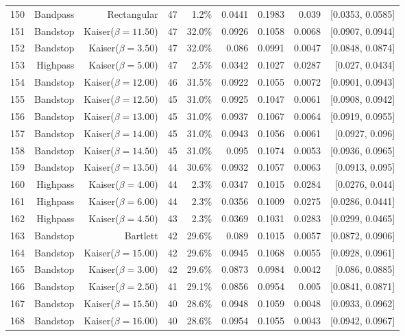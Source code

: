 \begin{longtable}{lrrrrrrrr}
    150 & Bandpass & Rectangular & 47 & 1.2\% & 0.0441 & 0.1983 & 0.039 & [0.0353, 0.0585] \\
    151 & Bandstop & Kaiser($\beta=11.50$) & 47 & 32.0\% & 0.0926 & 0.1058 & 0.0068 & [0.0907, 0.0944] \\
    152 & Bandstop & Kaiser($\beta=3.50$) & 47 & 32.0\% & 0.086 & 0.0991 & 0.0047 & [0.0848, 0.0874] \\
    153 & Highpass & Kaiser($\beta=5.00$) & 47 & 2.5\% & 0.0342 & 0.1027 & 0.0287 & [0.027, 0.0434] \\
    154 & Bandstop & Kaiser($\beta=12.00$) & 46 & 31.5\% & 0.0922 & 0.1055 & 0.0072 & [0.0901, 0.0943] \\
    155 & Bandstop & Kaiser($\beta=12.50$) & 45 & 31.0\% & 0.0925 & 0.1047 & 0.0061 & [0.0908, 0.0942] \\
    156 & Bandstop & Kaiser($\beta=13.00$) & 45 & 31.0\% & 0.0937 & 0.1067 & 0.0064 & [0.0919, 0.0955] \\
    157 & Bandstop & Kaiser($\beta=14.00$) & 45 & 31.0\% & 0.0943 & 0.1056 & 0.0061 & [0.0927, 0.096] \\
    158 & Bandstop & Kaiser($\beta=14.50$) & 45 & 31.0\% & 0.095 & 0.1074 & 0.0053 & [0.0936, 0.0965] \\
    159 & Bandstop & Kaiser($\beta=13.50$) & 44 & 30.6\% & 0.0932 & 0.1057 & 0.0063 & [0.0913, 0.095] \\
    160 & Highpass & Kaiser($\beta=4.00$) & 44 & 2.3\% & 0.0347 & 0.1015 & 0.0284 & [0.0276, 0.044] \\
    161 & Highpass & Kaiser($\beta=6.00$) & 44 & 2.3\% & 0.0356 & 0.1009 & 0.0275 & [0.0286, 0.0441] \\
    162 & Highpass & Kaiser($\beta=4.50$) & 43 & 2.3\% & 0.0369 & 0.1031 & 0.0283 & [0.0299, 0.0465] \\
    163 & Bandstop & Bartlett & 42 & 29.6\% & 0.089 & 0.1015 & 0.0057 & [0.0872, 0.0906] \\
    164 & Bandstop & Kaiser($\beta=15.00$) & 42 & 29.6\% & 0.0945 & 0.1068 & 0.0055 & [0.0928, 0.0961] \\
    165 & Bandstop & Kaiser($\beta=3.00$) & 42 & 29.6\% & 0.0873 & 0.0984 & 0.0042 & [0.086, 0.0885] \\
    166 & Bandstop & Kaiser($\beta=2.50$) & 41 & 29.1\% & 0.0856 & 0.0954 & 0.005 & [0.0841, 0.0871] \\
    167 & Bandstop & Kaiser($\beta=15.50$) & 40 & 28.6\% & 0.0948 & 0.1059 & 0.0048 & [0.0933, 0.0962] \\
    168 & Bandstop & Kaiser($\beta=16.00$) & 40 & 28.6\% & 0.0954 & 0.1055 & 0.0043 & [0.0942, 0.0967] \\

\end{longtable}
